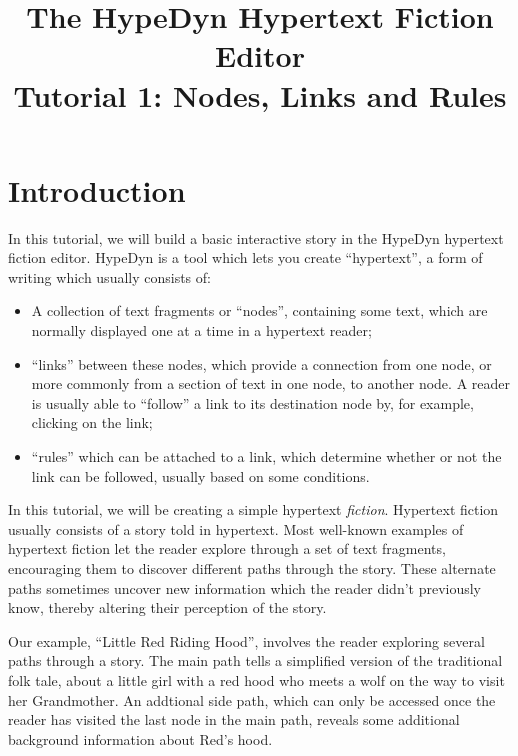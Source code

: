 \documentclass{article}
\begin{document}
\title{The HypeDyn Hypertext Fiction Editor\\Tutorial 1: Nodes, Links and Rules}
\date{}

\onecolumn
\maketitle

\tableofcontents


\section{Introduction}
In this tutorial, we will build a basic interactive story in the HypeDyn
hypertext fiction editor. HypeDyn is a tool which lets you create ``hypertext'',
a form of writing which usually consists of:

\begin{itemize}
  \item A collection of text fragments or ``nodes'', containing some text, which
  are normally displayed one at a time in a hypertext reader;
  \item ``links'' between these nodes, which provide a connection from one node,
  or more commonly from a section of text in one node, to another node. A reader
  is usually able to ``follow'' a link to its destination node by, for example,
  clicking on the link; 
  \item ``rules'' which can be attached to a link, which determine whether or
  not the link can be followed, usually based on some conditions.
\end{itemize}

In this tutorial, we will be creating a simple hypertext \textit{fiction}.
Hypertext fiction usually consists of a story told in hypertext. Most well-known
examples of hypertext fiction let the reader explore through a set of text
fragments, encouraging them to discover different paths through the story. These
alternate paths sometimes uncover new information which the reader didn't
previously know, thereby altering their perception of the story.

Our example, ``Little Red Riding Hood'', involves the reader exploring several
paths through a story. The main path tells a simplified version of the
traditional folk tale, about a little girl with a red hood who meets a wolf on
the way to visit her Grandmother. An addtional side path, which can only be accessed once
the reader has visited the last node in the main path, reveals some additional
background information about Red's hood.
\end{document}
